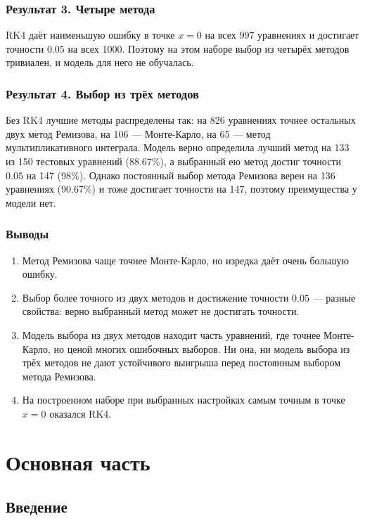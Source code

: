 \documentclass[14pt,a4paper]{extarticle}
\begin{document}
\subsubsection*{Результат 3. Четыре метода}
RK4 даёт наименьшую ошибку в точке $x=0$ на всех 997 уравнениях
и достигает точности $0.05$ на всех 1000. Поэтому на этом наборе выбор
из четырёх методов тривиален, и модель для него не обучалась.

\subsubsection*{Результат 4. Выбор из трёх методов}
Без RK4 лучшие методы распределены так: на 826 уравнениях точнее
остальных двух метод Ремизова, на 106 --- Монте-Карло, на 65 --- метод
мультипликативного интеграла. Модель верно определила лучший метод на 133 из 150
тестовых уравнений (88.67\%), а выбранный ею метод достиг точности $0.05$
на 147 (98\%). Однако постоянный выбор метода Ремизова верен на 136
уравнениях (90.67\%) и тоже достигает точности на 147, поэтому
преимущества у модели нет.

\subsubsection*{Выводы}
\begin{enumerate}
\item Метод Ремизова чаще точнее Монте-Карло, но изредка даёт очень
большую ошибку.
\item Выбор более точного из двух методов и достижение точности $0.05$ ---
разные свойства: верно выбранный метод может не достигать точности.
\item Модель выбора из двух методов находит часть уравнений, где точнее
Монте-Карло, но ценой многих ошибочных выборов. Ни она, ни модель выбора
из трёх методов не дают устойчивого выигрыша перед постоянным выбором
метода Ремизова.
\item На построенном наборе при выбранных настройках самым точным
в точке $x=0$ оказался RK4.
\end{enumerate}
\endgroup
\clearpage
\tableofcontents
\clearpage

\section{Основная часть}
\subsection{Введение}
\end{document}
